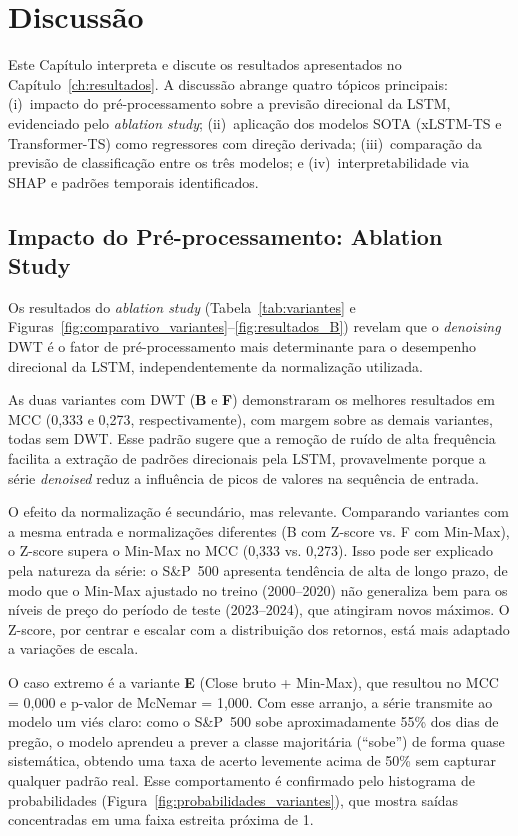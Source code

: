 \chapter[Discussão]{Discussão}
\label{ch:discussao}

Este Capítulo interpreta e discute os resultados apresentados no Capítulo~\ref{ch:resultados}. A discussão abrange quatro tópicos principais: (i)~impacto do pré-processamento sobre a previsão direcional da LSTM, evidenciado pelo \textit{ablation study}; (ii)~aplicação dos modelos SOTA (xLSTM-TS e Transformer-TS) como regressores com direção derivada; (iii)~comparação da previsão de classificação entre os três modelos; e (iv)~interpretabilidade via SHAP e padrões temporais identificados.

\section{Impacto do Pré-processamento: Ablation Study}
\label{sec:disc_ablation}

Os resultados do \textit{ablation study} (Tabela~\ref{tab:variantes} e Figuras~\ref{fig:comparativo_variantes}--\ref{fig:resultados_B}) revelam que o \textit{denoising} DWT é o fator de pré-processamento mais determinante para o desempenho direcional da LSTM, independentemente da normalização utilizada.

As duas variantes com DWT (\textbf{B} e \textbf{F}) demonstraram os melhores resultados em MCC (0,333 e 0,273, respectivamente), com margem sobre as demais variantes, todas sem DWT. Esse padrão sugere que a remoção de ruído de alta frequência facilita a extração de padrões direcionais pela LSTM, provavelmente porque a série \textit{denoised} reduz a influência de picos de valores na sequência de entrada.

O efeito da normalização é secundário, mas relevante. Comparando variantes com a mesma entrada e normalizações diferentes (B com Z-score vs. F com Min-Max), o Z-score supera o Min-Max no MCC (0,333 vs. 0,273). Isso pode ser explicado pela natureza da série: o S\&P~500 apresenta tendência de alta de longo prazo, de modo que o Min-Max ajustado no treino (2000--2020) não generaliza bem para os níveis de preço do período de teste (2023--2024), que atingiram novos máximos. O Z-score, por centrar e escalar com a distribuição dos retornos, está mais adaptado a variações de escala.

O caso extremo é a variante \textbf{E} (Close bruto + Min-Max), que resultou no MCC = 0,000 e p-valor de McNemar = 1,000. Com esse arranjo, a série transmite ao modelo um viés claro: como o S\&P~500 sobe aproximadamente 55\% dos dias de pregão, o modelo aprendeu a prever a classe majoritária (``sobe'') de forma quase sistemática, obtendo uma taxa de acerto levemente acima de 50\% sem capturar qualquer padrão real. Esse comportamento é confirmado pelo histograma de probabilidades (Figura~\ref{fig:probabilidades_variantes}), que mostra saídas concentradas em uma faixa estreita próxima de 1.

